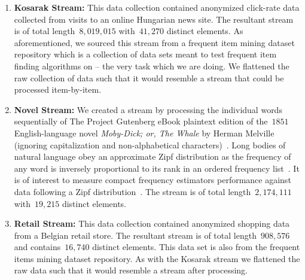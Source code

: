 \begin{enumerate}

    \item \textbf{Kosarak Stream:} This data collection contained anonymized click-rate data collected from visits to an online Hungarian news site. The resultant stream is of total length~$8,019,015$ with~$41,270$ distinct elements. As aforementioned, we sourced this stream from a frequent item mining dataset repository which is a collection of data sets meant to test frequent item finding algorithms on -- the very task which we are doing. We flattened the raw collection of data such that it would resemble a stream that could be processed item-by-item.

    \item \textbf{Novel Stream:} We created a stream by processing the individual words sequentially of The Project Gutenberg eBook plaintext edition of the~$1851$ English-language novel \textit{Moby-Dick; or, The Whale} by Herman Melville (ignoring capitalization and non-alphabetical characters)~\cite{melville1851}. %
    Long bodies of natural language obey an approximate Zipf distribution as the frequency of any word is inversely proportional to its rank in an ordered frequency list~\cite{adamic2002zipf}.  It is of interest to measure compact frequency estimators performance against data following a Zipf distribution~\cite{charikar2002finding,cormode2005s,yang2019heavykeeper,radu2010,metwally2006,manku2002approximate}. The stream is of total length~$2,174,111$ with~$19,215$ distinct elements.
 
    \item \textbf{Retail Stream:} This data collection contained anonymized shopping data from a Belgian retail store. The resultant stream is of total length~$908,576$ and contains~$16,740$ distinct elements. This data set is also from the frequent items mining dataset repository. As with the Kosarak stream we flattened the raw data such that it would resemble a stream after processing. 
\end{enumerate}

